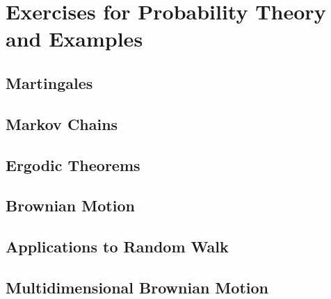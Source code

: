 \chapter{Exercises for Probability Theory and Examples}

\section{Martingales}

\section{Markov Chains}

\section{Ergodic Theorems}

\section{Brownian Motion}

\section{Applications to Random Walk}

\section{Multidimensional Brownian Motion}